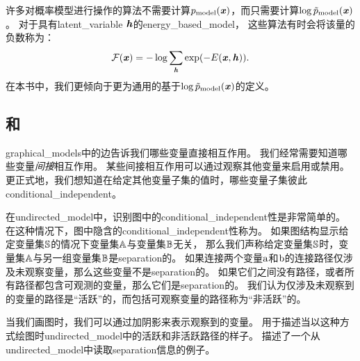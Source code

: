 许多对概率模型进行操作的算法不需要计算$p_{\text{model}}(\boldsymbol{\mathit{x}})$，而只需要计算$\log \tilde{p}_{\text{model}}(\boldsymbol{\mathit{x}})$。
对于具有\gls{latent_variable} $\boldsymbol{\mathit{h}}$的\gls{energy_based_model}， 这些算法有时会将该量的负数称为：
\begin{align}
\label{eqn:168}
\mathcal{F} (\boldsymbol{\mathit{x}}) = -\log \sum_{\boldsymbol{\mathit{h}}} \exp(-E(\boldsymbol{\mathit{x}},\boldsymbol{\mathit{h}})).
\end{align}
在本书中，我们更倾向于更为通用的基于$\log \tilde{p}_{\text{model}}(\boldsymbol{\mathit{x}})$的定义。


\subsection{和}
\label{sec:separation_and_d_separation}

\gls{graphical_models}中的边告诉我们哪些变量直接相互作用。
我们经常需要知道哪些变量\emph{间接}相互作用。 
某些间接相互作用可以通过观察其他变量来启用或禁用。
更正式地，我们想知道在给定其他变量子集的值时，哪些变量子集彼此\gls{conditional_independent}。


在\gls{undirected_model}中，识别图中的\gls{conditional_independent}性是非常简单的。 
在这种情况下，图中隐含的\gls{conditional_independent}性称为。
如果图结构显示给定变量集$\mathbb{S}$的情况下变量集$\mathbb{A}$与变量集$\mathbb{B}$无关，
那么我们声称给定变量集$\mathbb{S}$时，变量集$\mathbb{A}$与另一组变量集$\mathbb{B}$是\gls{separation}的。
如果连接两个变量$\mathrm{a}$和$\mathrm{b}$的连接路径仅涉及未观察变量，那么这些变量不是\gls{separation}的。
如果它们之间没有路径，或者所有路径都包含可观测的变量，那么它们是\gls{separation}的。
我们认为仅涉及未观察到的变量的路径是``活跃''的，而包括可观察变量的路径称为``非活跃''的。


当我们画图时，我们可以通过加阴影来表示观察到的变量。
用于描述当以这种方式绘图时\gls{undirected_model}中的活跃和非活跃路径的样子。
描述了一个从\gls{undirected_model}中读取\gls{separation}信息的例子。


